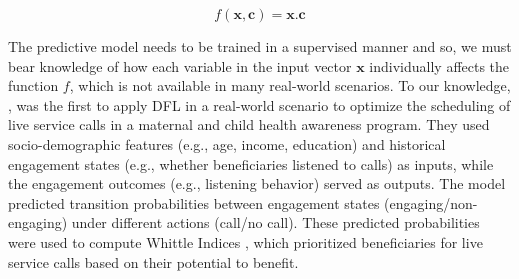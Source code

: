 \documentclass[12pt, letterpaper]{article}
\begin{document}
\begin{equation}
    f(\mathbf{x}, \mathbf{c}) = \mathbf{x}.{\mathbf{c}}
\end{equation}

The predictive model needs to be trained in a supervised manner and so, we must
bear knowledge of how each variable in the input vector $\mathbf{x}$
individually affects the function $f$, which is not available in many real-world
scenarios. To our knowledge, \cite{Google_DFL}, was the first to apply DFL in a
real-world scenario to optimize the scheduling of live service calls in a
maternal and child health awareness program. They used socio-demographic
features (e.g., age, income, education) and historical engagement states (e.g.,
whether beneficiaries listened to calls) as inputs, while the engagement
outcomes (e.g., listening behavior) served as outputs. The model predicted
transition probabilities between engagement states (engaging/non-engaging) under
different actions (call/no call). These predicted probabilities were used to
compute Whittle Indices \cite{P.Whittle}, which prioritized beneficiaries for
live service calls based on their potential to benefit. 
\end{document}
